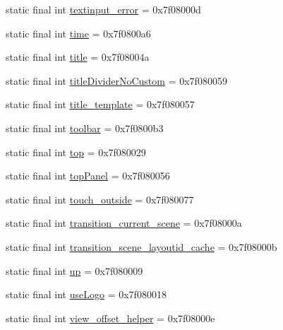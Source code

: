 \begin{CompactItemize}
\item 
static final int \hyperlink{classandroid_1_1support_1_1coreutils_1_1_r_1_1id_ec0ef39c698cc2b662414a526538e3f5}{textinput\_\-error} = 0x7f08000d
\item 
static final int \hyperlink{classandroid_1_1support_1_1coreutils_1_1_r_1_1id_a822097f1e6f3002db663e2e931ebd4e}{time} = 0x7f0800a6
\item 
static final int \hyperlink{classandroid_1_1support_1_1coreutils_1_1_r_1_1id_bb8b04bf4708c5611ca83e8c1b3be241}{title} = 0x7f08004a
\item 
static final int \hyperlink{classandroid_1_1support_1_1coreutils_1_1_r_1_1id_afb4fbdc0e6f7aa60d4e4fab99228e52}{titleDividerNoCustom} = 0x7f080059
\item 
static final int \hyperlink{classandroid_1_1support_1_1coreutils_1_1_r_1_1id_da6b901f75255f43d58bd59ac16e74c0}{title\_\-template} = 0x7f080057
\item 
static final int \hyperlink{classandroid_1_1support_1_1coreutils_1_1_r_1_1id_1428f1ce76e4992fe870b156355f5e98}{toolbar} = 0x7f0800b3
\item 
static final int \hyperlink{classandroid_1_1support_1_1coreutils_1_1_r_1_1id_48132fa2871044ef067ce1d1bed85e4e}{top} = 0x7f080029
\item 
static final int \hyperlink{classandroid_1_1support_1_1coreutils_1_1_r_1_1id_dcd158a2004eb8b26c75cda596c14fdf}{topPanel} = 0x7f080056
\item 
static final int \hyperlink{classandroid_1_1support_1_1coreutils_1_1_r_1_1id_5ed814fc9ddb15918b30e1eb7dfe79ef}{touch\_\-outside} = 0x7f080077
\item 
static final int \hyperlink{classandroid_1_1support_1_1coreutils_1_1_r_1_1id_21a5a0a7b46dc9d5499bb8d8293a7405}{transition\_\-current\_\-scene} = 0x7f08000a
\item 
static final int \hyperlink{classandroid_1_1support_1_1coreutils_1_1_r_1_1id_fc0cb6c86ab9494fee0882083a49a723}{transition\_\-scene\_\-layoutid\_\-cache} = 0x7f08000b
\item 
static final int \hyperlink{classandroid_1_1support_1_1coreutils_1_1_r_1_1id_e0b732cb4780300e832c0991fc7a2801}{up} = 0x7f080009
\item 
static final int \hyperlink{classandroid_1_1support_1_1coreutils_1_1_r_1_1id_d5f64ce348bfca6d7c4228b41b69b602}{useLogo} = 0x7f080018
\item 
static final int \hyperlink{classandroid_1_1support_1_1coreutils_1_1_r_1_1id_80ae26c1ea3bda6a34f3c757e03b267c}{view\_\-offset\_\-helper} = 0x7f08000e

\end{CompactItemize}
